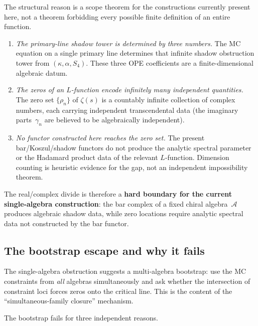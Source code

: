 \documentclass[11pt]{article}
\newcommand{\cA}{\mathcal{A}}
\begin{document}
The structural reason is a scope theorem for the constructions
currently present here, not a theorem forbidding every possible
finite definition of an entire function.

\begin{enumerate}
\item \emph{The primary-line shadow tower is determined by three numbers.}
The MC equation on a single primary line determines that
infinite shadow obstruction tower from $(\kappa, \alpha, S_4)$.  These
three OPE coefficients are a finite-dimensional algebraic
datum.

\item \emph{The zeros of an $L$-function encode infinitely
many independent quantities.}  The zero set
$\{\rho_n\}$ of $\zeta(s)$ is a countably infinite collection
of complex numbers, each carrying independent transcendental
data (the imaginary parts~$\gamma_n$ are believed to be
algebraically independent).

\item \emph{No functor constructed here reaches the zero set.}
The present bar/Koszul/shadow functors do not produce the
analytic spectral parameter or the Hadamard product data of
the relevant $L$-function.  Dimension counting is heuristic
evidence for the gap, not an independent impossibility theorem.
\end{enumerate}

The real/complex divide is therefore a \textbf{hard boundary for
the current single-algebra construction}: the bar complex of a
fixed chiral algebra~$\cA$ produces algebraic shadow data, while
zero locations require analytic spectral data not constructed by
the bar functor.

\subsection{The bootstrap escape and why it fails}

The single-algebra obstruction suggests a multi-algebra
bootstrap: use the MC constraints from \emph{all} algebras
simultaneously and ask whether the intersection of constraint
loci forces zeros onto the critical line.  This is the content
of the ``simultaneous-family closure'' mechanism.

The bootstrap fails for three independent reasons.
\end{document}
